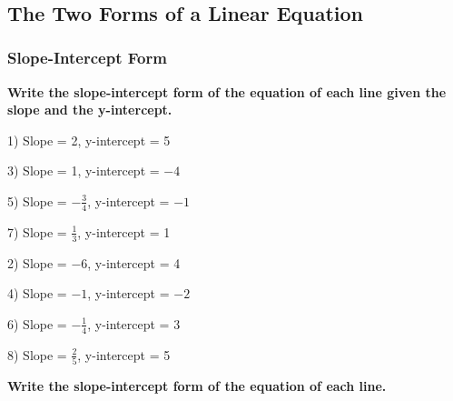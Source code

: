 \documentclass[11pt]{book}
\newcommand{\tmstrong}[1]{\textbf{#1}}
\theoremstyle{definition}  %
\begin{document}
\vspace{2in}
~

\pagebreak

\subsection{The Two Forms of a Linear Equation}\par

	\subsubsection{Slope-Intercept Form}\par

{\tmstrong{Write the slope-intercept form of the equation of each line given
the slope and the y-intercept.}}

\begin{multicols}{2}
  1) Slope = 2, y-intercept = 5
  
  3) Slope = 1, y-intercept = $- 4$
  
  5) Slope = $- \frac{3}{4}$, y-intercept = $- 1$
  
  7) Slope = $\frac{1}{3}$, y-intercept = 1
  
  2) Slope = $- 6$, y-intercept = 4
  
  4) Slope = $- 1$, y-intercept = $- 2$
  
  6) Slope = $- \frac{1}{4}$, y-intercept = 3
  
  8) Slope = $\frac{2}{5}$, y-intercept = 5
\end{multicols}

{\tmstrong{Write the slope-intercept form of the equation of each line.}}
\end{document}
